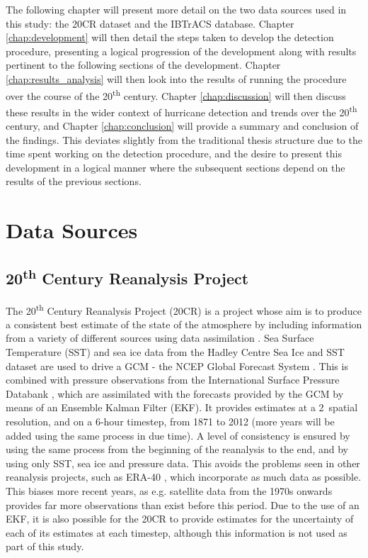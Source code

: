 \documentclass[pdftex,12pt,a4paper]{report}
\newcommand{\ts}{\textsuperscript}
\begin{document}
The following chapter will present more detail on the two data sources used in this study: the
20CR dataset and the IBTrACS database. Chapter \ref{chap:development} will then detail the steps
taken to develop the detection procedure, presenting a logical progression of the development along
with results pertinent to the following sections of the development. Chapter
\ref{chap:results_analysis} will then look into the results of running the procedure over the course
of the 20\ts{th} century. Chapter \ref{chap:discussion} will then discuss these results in the wider
context of hurricane detection and trends over the 20\ts{th} century, and Chapter
\ref{chap:conclusion} will provide a summary and conclusion of the findings. This deviates slightly
from the traditional thesis structure due to the time spent working on the detection procedure, and
the desire to present this development in a logical manner where the subsequent sections depend on
the results of the previous sections.

\chapter{Data Sources}

\section{20\ts{th} Century Reanalysis Project}
\label{sec:20crp}

The 20\ts{th} Century Reanalysis Project (20CR) is a project whose aim is to produce a consistent
best estimate of the state of the atmosphere by including information from a variety of different
sources using data assimilation \parencite{compoTwentieth2011}. Sea Surface Temperature (SST) and
sea ice data from the Hadley Centre Sea Ice and SST dataset \parencite{rayner2003global} are used to drive
a GCM - the NCEP Global Forecast System \parencite{kanamitsu1989description, kanamitsu1991recent}.
This is combined with pressure observations from the International Surface Pressure Databank
\parencite{yin2008international}, which are assimilated with the forecasts provided by the GCM by
means of an Ensemble Kalman Filter (EKF). It provides estimates at a 2\textdegree\ spatial
resolution, and on a 6-hour timestep, from 1871 to 2012 (more years will be added using the same
process in due time). A level of consistency is ensured by using the same process from the beginning
of the reanalysis to the end, and by using only SST, sea ice and pressure data. This avoids the
problems seen in other reanalysis projects, such as ERA-40 \parencite{uppala2005era}, which
incorporate as much data as possible. This biases more recent years, as e.g. satellite data from the
1970s onwards provides far more observations than exist before this period. Due to the use of an
EKF, it is also possible for the 20CR to provide estimates for the uncertainty of each of its
estimates at each timestep, although this information is not used as part of this study.
\end{document}
